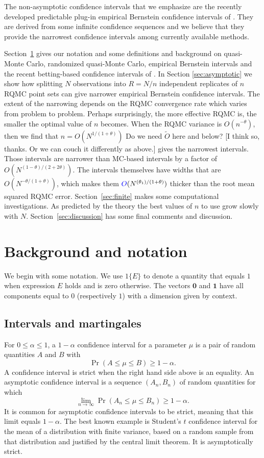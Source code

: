 \documentclass{article}
\newcommand{\art}[1]{\begingroup\color{blue}#1\endgroup}
\newcommand{\fred}[1]{\begingroup\color{red}#1\endgroup}
\renewcommand{\le}{\leqslant}
\renewcommand{\ge}{\geqslant}
\newcommand{\bsone}{\boldsymbol{1}}
\newcommand{\bszero}{\boldsymbol{0}}
\begin{document}
The non-asymptotic confidence intervals that we emphasize are the
recently developed predictable plug-in empirical Bernstein
confidence intervals of \cite{WauRam24a}. They are derived
from some infinite confidence sequences and we believe that
they provide the narrowest confidence intervals among
currently available methods.

Section~\ref{sec:notation} gives our notation
and some definitions and background on quasi-Monte
Carlo, randomized quasi-Monte Carlo, empirical Bernstein
intervals and the recent betting-based confidence
intervals of \cite{WauRam24a}. In Section \ref{sec:asymptotic}
we show how splitting $N$ observations into $R=N/n$ independent
replicates of $n$ RQMC point sets can give narrower
empirical Bernstein confidence intervals.  The extent of the
narrowing depends on the RQMC convergence rate which
varies from problem to problem. Perhaps surprisingly,
the more effective RQMC is, the smaller the optimal value
of $n$ becomes. \art{When the RQMC variance is $O(n^{-\theta})$, then} we find that $n=O(N^{1/(1+\theta)})$ \fred{Do we need $\tilde O$ here and below?} \art{[I think so, thanks. Or we can couch it differently as above.]} gives
the narrowest intervals.  Those intervals are narrower
than MC-based intervals by a factor of $O(N^{(1-\theta)/(2+2\theta)})$.
The intervals themselves have widths that are
$O(N^{-\theta/(1+\theta)})$\fred{, which makes them $\art{O}(N^{(\theta_1)/(1+\theta)})$ thicker than the root mean squared RQMC error}. Section~\ref{sec:finite} makes
some computational investigations.  As predicted by the theory
the best values of $n$ to use grow slowly with $N$.
Section~\ref{sec:discussion} has some final comments
and discussion.


\section{Background and notation}\label{sec:notation}

We begin with some notation.
We use $1\{E\}$ to denote a quantity that equals $1$
when expression $E$ holds and is zero otherwise.
The vectors $\bszero$ and $\bsone$ have all components
equal to $0$ (respectively $1$) with a dimension
given by context.

\subsection{Intervals and martingales}

For $0\le\alpha\le 1$, a $1-\alpha$ confidence interval for a 
parameter $\mu$ is a pair of random quantities $A$ and $B$ with
$$
\Pr( A\le \mu\le B)\ge 1-\alpha.
$$
A confidence interval is strict when the right hand
side above is an equality.
An asymptotic confidence interval is a sequence $(A_n,B_n)$
of random quantities for which
$$
\lim_{n\to\infty}\Pr( A_n\le \mu\le B_n)\ge 1-\alpha.
$$
It is common for asymptotic confidence intervals to
be strict, meaning that this limit equals $1-\alpha$.
The best known example is Student's $t$ confidence
interval for the mean of a distribution with finite
variance, based on a random sample 
from that distribution and justified by the
central limit theorem.  It is asymptotically strict.
\end{document}
